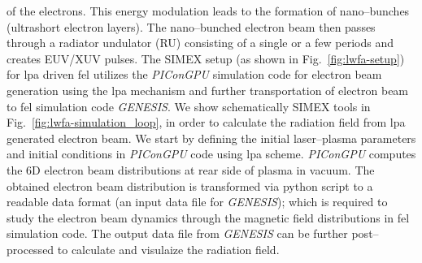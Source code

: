 of the electrons. This energy modulation leads to the formation of nano--bunches
(ultrashort electron layers). The nano--bunched electron beam then passes through
a radiator undulator (RU) consisting of a single or a few periods and creates
EUV/XUV pulses.
%
The SIMEX setup (as shown in Fig.~\ref{fig:lwfa-setup}) for \gls{lpa} driven \gls{fel}
utilizes the \textit{PIConGPU} simulation code for electron beam generation using the \gls{lpa}
mechanism and further transportation of electron beam to \gls{fel} simulation code
\textit{GENESIS}. We show schematically SIMEX tools in
Fig.~\ref{fig:lwfa-simulation_loop}, in order to calculate the radiation field
from \gls{lpa} generated electron beam. We start by defining the initial laser--plasma
parameters and initial conditions in \textit{PIConGPU} code using \gls{lpa} scheme.
\textit{PIConGPU} computes the 6D electron beam distributions at rear
side of  plasma in vacuum. The obtained electron beam distribution is
transformed via python script to a readable data format (an input data file for
\textit{GENESIS}); which is required to study the electron beam dynamics through the
magnetic field distributions in \gls{fel} simulation code. The output data file from
\textit{GENESIS} can be further post--processed to calculate and visulaize the radiation
field.

